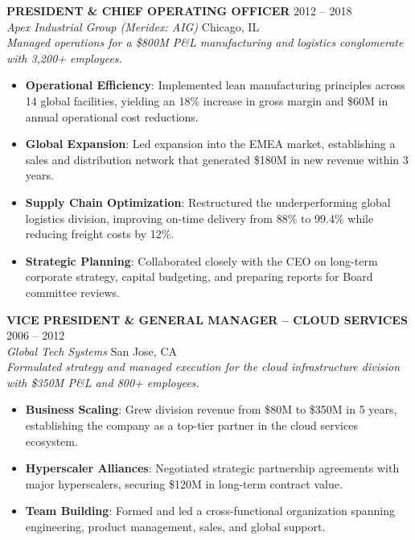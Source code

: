 \documentclass[10pt,letterpaper]{article}
\begin{document}
\noindent
\textbf{\large\color{primaryColor} PRESIDENT \& CHIEF OPERATING OFFICER} \hfill {\color{subtleColor}\small 2012 -- 2018} \\
\textit{Apex Industrial Group (Meridex: AIG)} \hfill {\color{subtleColor}\small Chicago, IL} \\
\vspace{3pt}
{\color{textColor}\small\textit{Managed operations for a \$800M P\&L manufacturing and logistics conglomerate with 3,200+ employees.}}
\begin{itemize}
    \item \textbf{Operational Efficiency}: Implemented lean manufacturing principles across 14 global facilities, yielding an 18\% increase in gross margin and \$60M in annual operational cost reductions.
    \item \textbf{Global Expansion}: Led expansion into the EMEA market, establishing a sales and distribution network that generated \$180M in new revenue within 3 years.
    \item \textbf{Supply Chain Optimization}: Restructured the underperforming global logistics division, improving on-time delivery from 88\% to 99.4\% while reducing freight costs by 12\%.
    \item \textbf{Strategic Planning}: Collaborated closely with the CEO on long-term corporate strategy, capital budgeting, and preparing reports for Board committee reviews.
\end{itemize}

\newpage

\noindent
\textbf{\large\color{primaryColor} VICE PRESIDENT \& GENERAL MANAGER -- CLOUD SERVICES} \hfill {\color{subtleColor}\small 2006 -- 2012} \\
\textit{Global Tech Systems} \hfill {\color{subtleColor}\small San Jose, CA} \\
\vspace{3pt}
{\color{textColor}\small\textit{Formulated strategy and managed execution for the cloud infrastructure division with \$350M P\&L and 800+ employees.}}
\begin{itemize}
    \item \textbf{Business Scaling}: Grew division revenue from \$80M to \$350M in 5 years, establishing the company as a top-tier partner in the cloud services ecosystem.
    \item \textbf{Hyperscaler Alliances}: Negotiated strategic partnership agreements with major hyperscalers, securing \$120M in long-term contract value.
    \item \textbf{Team Building}: Formed and led a cross-functional organization spanning engineering, product management, sales, and global support.
\end{itemize}
\end{document}
